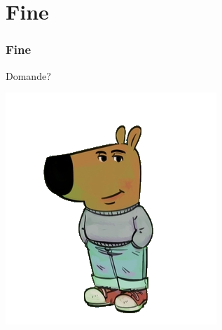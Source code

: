 \documentclass{beamer}
\begin{document}
    \section{Fine}

        \begin{frame}
            \frametitle{Fine}
            \centering
            \Huge{Domande?}

            \includegraphics{images/Chill.png}
        \end{frame}
\end{document}
